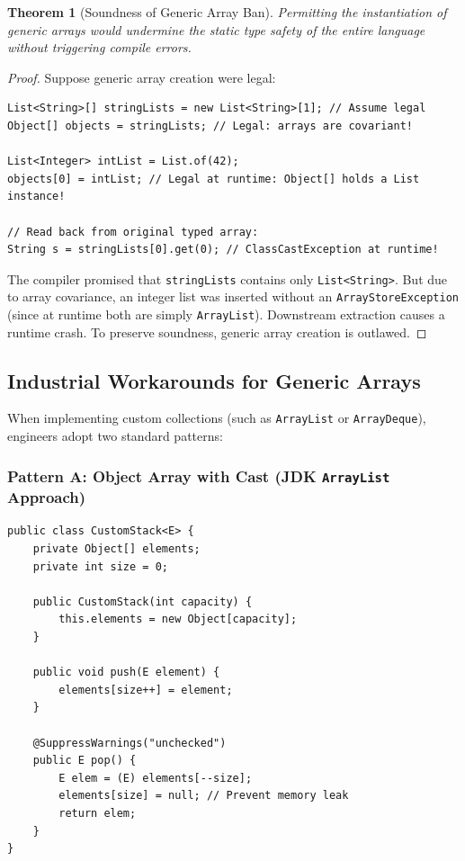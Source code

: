 \documentclass[10pt,journal,compsoc,onecolumn]{IEEEtran}
\newtheorem{theorem}{Theorem}
\begin{document}
\begin{theorem}[Soundness of Generic Array Ban]
Permitting the instantiation of generic arrays would undermine the static type safety of the entire language without triggering compile errors.
\end{theorem}
\begin{proof}
Suppose generic array creation were legal:
\begin{lstlisting}
List<String>[] stringLists = new List<String>[1]; // Assume legal
Object[] objects = stringLists; // Legal: arrays are covariant!

List<Integer> intList = List.of(42);
objects[0] = intList; // Legal at runtime: Object[] holds a List instance!

// Read back from original typed array:
String s = stringLists[0].get(0); // ClassCastException at runtime!
\end{lstlisting}
The compiler promised that \texttt{stringLists} contains only \texttt{List<String>}. But due to array covariance, an integer list was inserted without an \texttt{ArrayStoreException} (since at runtime both are simply \texttt{ArrayList}). Downstream extraction causes a runtime crash. To preserve soundness, generic array creation is outlawed.
\end{proof}

\subsection{Industrial Workarounds for Generic Arrays}
When implementing custom collections (such as \texttt{ArrayList} or \texttt{ArrayDeque}), engineers adopt two standard patterns:

\subsubsection{Pattern A: Object Array with Cast (JDK \texttt{ArrayList} Approach)}
\begin{lstlisting}[caption={Object Array Internal Storage with Unchecked Cast}]
public class CustomStack<E> {
    private Object[] elements;
    private int size = 0;

    public CustomStack(int capacity) {
        this.elements = new Object[capacity];
    }

    public void push(E element) {
        elements[size++] = element;
    }

    @SuppressWarnings("unchecked")
    public E pop() {
        E elem = (E) elements[--size];
        elements[size] = null; // Prevent memory leak
        return elem;
    }
}
\end{lstlisting}
\end{document}
